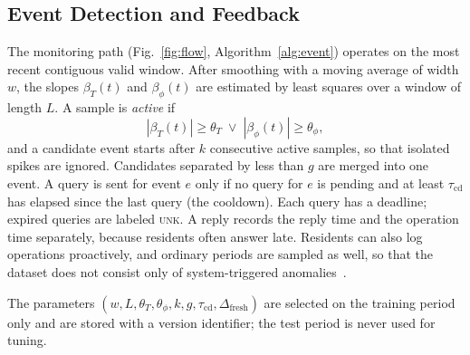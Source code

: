 \subsection{Event Detection and Feedback}
The monitoring path (Fig.~\ref{fig:flow}, Algorithm~\ref{alg:event}) operates on the most recent contiguous valid window. After smoothing with a moving average of width $w$, the slopes $\beta_T(t)$ and $\beta_\phi(t)$ are estimated by least squares over a window of length $L$. A sample is \emph{active} if
\begin{equation}
|\beta_T(t)|\ge\theta_T \;\lor\; |\beta_\phi(t)|\ge\theta_\phi ,
\label{eq:active}
\end{equation}
and a candidate event starts after $k$ consecutive active samples, so that isolated spikes are ignored. Candidates separated by less than $g$ are merged into one event. A query is sent for event $e$ only if no query for $e$ is pending and at least $\tau_{\mathrm{cd}}$ has elapsed since the last query (the cooldown). Each query has a deadline; expired queries are labeled \textsc{unk}. A reply records the reply time and the operation time separately, because residents often answer late. Residents can also log operations proactively, and ordinary periods are sampled as well, so that the dataset does not consist only of system-triggered anomalies~\cite{settles2009active}.

The parameters $(w, L, \theta_T, \theta_\phi, k, g, \tau_{\mathrm{cd}}, \Delta_{\mathrm{fresh}})$ are selected on the training period only and are stored with a version identifier; the test period is never used for tuning.

